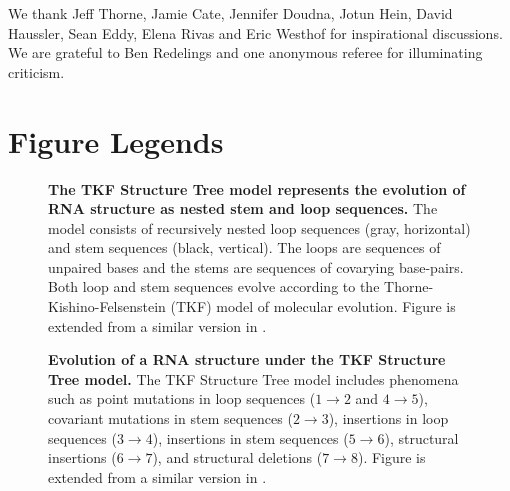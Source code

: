 \documentclass[10pt]{article}
\begin{document}
We thank
Jeff Thorne,
Jamie Cate,
Jennifer Doudna,
Jotun Hein,
David Haussler,
Sean Eddy,
Elena Rivas and
Eric Westhof
for inspirational discussions.
We are grateful to Ben Redelings and one anonymous referee for illuminating criticism.




\clearpage
\section*{Figure Legends}

\begin{figure}[!ht]
  \centering
  \caption{
    \textbf{The TKF Structure Tree model represents the
      evolution of RNA structure as nested stem and loop sequences.}
    The model consists of recursively nested loop sequences (gray,
    horizontal) and stem sequences (black, vertical). The loops are
    sequences of unpaired bases and the stems are sequences of
    covarying base-pairs. Both loop and stem sequences evolve
    according to the Thorne-Kishino-Felsenstein (TKF) model
    \cite{ThorneEtal91} of molecular evolution.  Figure is extended
    from a similar version in \cite{Holmes2004}.
  }
\end{figure}

\begin{figure}[!ht]
  \centering
  \caption{
    \textbf{Evolution of a RNA structure under the TKF Structure Tree
      model.}
    The TKF Structure Tree model includes phenomena such as point
    mutations in loop sequences ($1 \rightarrow 2$ and $4 \rightarrow 5$), covariant
    mutations in stem sequences ($2 \rightarrow 3$), insertions in
    loop sequences ($3 \rightarrow 4$), insertions in stem sequences
    ($5 \rightarrow 6$), structural insertions ($6 \rightarrow 7$),
    and structural deletions ($7 \rightarrow 8$).
   Figure is extended from a similar version in \cite{Holmes2004}.
  }
\end{figure}
\end{document}
